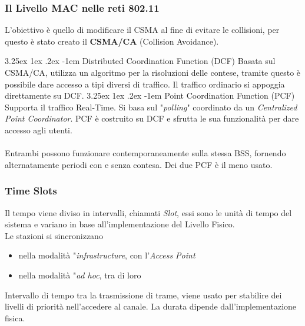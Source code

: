 \documentclass{article}
\makeatletter
\newcounter{subsubsubsection}[subsubsection]
\renewcommand\paragraph{\@startsection{paragraph}{5}{\z@}%
  {3.25ex \@plus1ex \@minus.2ex}%
  {-1em}%
  {\normalfont\normalsize\bfseries}}
\makeatother
\begin{document}
            \subsubsection{Il Livello MAC nelle reti 802.11}
                L'obiettivo è quello di modificare il CSMA al fine di evitare le collisioni, per questo è stato creato il \textbf{CSMA/CA} (Collision Avoidance).

                \paragraph{Distributed Coordination Function (DCF)} Basata sul CSMA/CA, utilizza un algoritmo per la risoluzioni delle contese, tramite questo è possibile dare accesso a tipi diversi di traffico. Il traffico ordinario si appoggia direttamente su DCF.
                \paragraph{Point Coordination Function (PCF)} Supporta il traffico Real-Time. Si basa sul "\textit{polling}" coordinato da un \textit{Centralized Point Coordinator}. PCF è costruito su DCF e sfrutta le sua funzionalità per dare accesso agli utenti.\\
                \\
                Entrambi possono funzionare contemporaneamente sulla stessa BSS, fornendo alternatamente periodi con e senza contesa. Dei due PCF è il meno usato.

            \subsubsection{Time Slots}
                Il tempo viene diviso in intervalli, chiamati \textit{Slot}, essi sono le unità di tempo del sistema e variano in base all'implementazione del Livello Fisico.\\
                Le stazioni si sincronizzano
                \begin{itemize}
                    \item nella modalità "\textit{infrastructure}, con l'\textit{Access Point}
                    \item nella modalità "\textit{ad hoc}, tra di loro
                \end{itemize}

                Intervallo di tempo tra la trasmissione di trame, viene usato per stabilire dei livelli di priorità nell'accedere al canale. La durata dipende dall'implementazione fisica.
\end{document}
